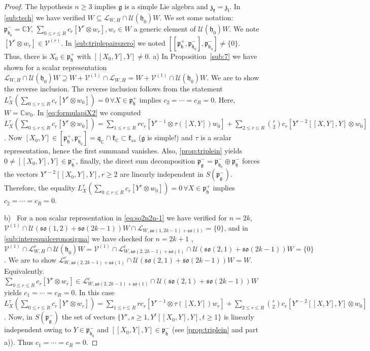 \documentclass[12pt]{amsart}
\theoremstyle{definition}
\theoremstyle{remark}
\newcommand{\g}{\mathfrak{g}}
\newcommand{\h}{\mathfrak{h}}
\renewcommand{\k}{{\mathfrak k}}
\renewcommand{\l}{\mathfrak l}
\newcommand{\p}{\mathfrak p}
\newcommand{\q}{\mathfrak q}
\newcommand{\z}{\mathfrak z}
\newcommand{\C}{{\mathbb C}}
\numberwithin{equation}{section}
\begin{document}
\begin{proof}The hypothesis $n\geq 3$ implies $\g$ is a simple Lie algebra and $\z_\k=\z_\l$.  In \ref{sub:tech} we have  verified $W\subseteq  \mathcal L_{W,H}\cap \mathcal U(\h_0)W$. We set some notation: $\p_{\h_0}^-=\C Y$, $\sum_{0\leq r \leq R} c_r [Y^r \otimes w_r], w_r \in W $ a generic element of $\mathcal U(\h_0)W$. We note $[Y^r \otimes w_r] \in \mathcal V^{(r)}$. In \ref{sub:triplepairszero} we noted $[[\p_\h^+, \p_{\h_0}^-],\p_{\h_0}^-]\not=\{0\}$. Thus, there is  $ X_0\in \p_{\h}^+ $ with $[[X_0,Y],Y] \not=0$.  a) In Proposition~\ref{sub:7} we have shown for a scalar representation  $ \mathcal L_{W,H}\cap \mathcal U(\h_0)W \supseteq W+\mathcal V^{(1)} \cap \mathcal L_{W,H}= W+\mathcal V^{(1)} \cap \mathcal U(\h_0)W$. We are to show the reverse inclusion. The
reverse inclusion  follows from the statement $L_X^\tau (\sum_{0\leq r \leq R} c_r [Y^r \otimes w_0])=0 \, \forall X \in \p_\h^+$ implies $c_2=\cdots =c_R=0$. Here, $W=\C w_0$. In \ref{eq:formulapiX2} we computed  $L_X^\tau (\sum_{0\leq r \leq R} c_r [Y^r \otimes w_0])=  \sum_{1\leq r \leq R} r c_r  [Y^{r-1} \otimes \tau([X,Y])w_0]+ \sum_{2\leq r \leq R} \binom{r}{2} c_r [Y^{r-2}[[X,Y],Y] \otimes w_0]  $. Now $[X_0,Y]\in [\p_\h^+, \p_{\h_0}^ -] =\q_\C \cap \k_\C \subset \k_{ss}$ ($\g$ is simple!) and $\tau$ is a scalar representation, hence the first summand vanishes.   Also,   \ref{prop:triplein} yields   $0\not= [[X_0,Y],Y] \in \p_\h^-$, finally, the direct sum decomposition $\p_\g^-=\p_{\h_0}^- \oplus \p_{\h}^-$ forces the vectors $Y^{r-2}[[X_0,Y],Y] , r\geq 2$ are linearly independent in $S(\p_\g^-)$. Therefore, the equality  $L_X^\tau (\sum_{0\leq r \leq R} c_r [Y^r \otimes w_0])=0 \, \forall X \in \p_\h^+$ implies $c_2=\cdots =c_R=0$.

 b) \, For a non scalar representation in \ref{eq:so2n2n-1} we have verified for   $n=2k$,  $ \mathcal V^{(1)} \cap \mathcal U(\mathfrak{so}(1,2)+\mathfrak{so}( 2k-1))W \cap \mathcal L_{W, \mathfrak{so}(1,2k-1)+\mathfrak{so}(1)}  =\{0\}$, and in \ref{sub:interequalceronosigma} we have checked for $n=2k+1$ , $\mathcal V^{(1)}\cap \mathcal L_{W,H}^c \cap \mathcal U(\h_0)W=  \mathcal V^{(1)}\cap \mathcal L_{W, \mathfrak{so}(2,2k-1)+\mathfrak{so}(1) }^c \cap \mathcal U(\mathfrak{so}(2,1)+\mathfrak{so}(2k-1))W =\{0\}$. We are to show $\mathcal L_{W, \mathfrak{so}(2,2k-1)+\mathfrak{so}(1) }^c \cap \mathcal U(\mathfrak{so}(2,1)+\mathfrak{so}(2k-1))W =W$. Equivalently.\\ $\sum_{0\leq r \leq R} c_r [Y^r \otimes w_r] \in \mathcal L_{W, \mathfrak{so}(2,2k-1)+\mathfrak{so}(1) }^c \cap \mathcal U(\mathfrak{so}(2,1)+\mathfrak{so}(2k-1))W$ yields $c_1=\cdots =c_R=0$. In this case $L_X^\tau (\sum_{0\leq r \leq R} c_r [Y^r \otimes w_r])= \sum_{1\leq r \leq R} r c_r  [Y^{r-1} \otimes \tau([X,Y])w_r]+ \sum_{2\leq r \leq R} \binom{r}{2} c_r [Y^{r-2}[[X,Y],Y] \otimes w_0]  $. Now, in $S(\p_\g^-)$ the set of vectors $\{Y^s, s\geq 1, Y^{t}[[X_0,Y],Y], t\geq 1\}$ is linearly independent owing to $Y\in \p_{\h_0}^- $ and  $[[X_0,Y],Y]\in \p_\h^-$ (see \ref{prop:triplein} and part a)). Thus $c_1=\cdots =c_R =0$.

\end{proof}
\end{document}
